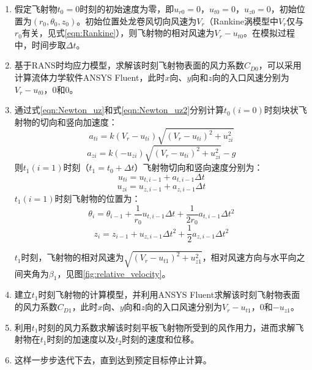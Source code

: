 \documentclass{ctexart}
\begin{document}
\begin{enumerate}
\item 假定飞射物$t_0=0$时刻的初始速度为零，即$u_{r0}=0$，$u_{t0}=0$，$u_{z0}=0$，初始位置为$(r_0,\theta_0,z_0)$。初始位置处龙卷风切向风速为$V_r$（Rankine涡模型中$V_r$仅与$r_0$有关，见式\eqref{eqn:Rankine}），则飞射物的相对风速为$V_r-u_{t0}$。在模拟过程中，时间步取$\Delta t$。
\item 基于RANS时均应力模型，求解该时刻飞射物表面的风力系数$C_{D0}$，可以采用计算流体力学软件ANSYS Fluent\textregistered ，此时$x$向、$y$向和$z$向的入口风速分别为$V_r-u_{t0}$，$0$和$0$。
\item 通过式\eqref{eqn:Newton_uz}和式\eqref{eqn:Newton_uz2}分别计算$t_0(i=0)$时刻块状飞射物的切向和竖向加速度：
\begin{equation}
a_{ti} = k \left(V_r-u_{ti}\right) \sqrt{\left(V_r-u_{ti}\right)^2 + u_{zi}^2}
\end{equation}
\begin{equation}
a_{zi} = k (-u_{zi}) \sqrt{\left(V_r-u_{ti}\right)^2 + u_{zi}^2} -g
\end{equation}
则$t_1(i=1)$时刻（$t_1=t_0+\Delta t$）飞射物切向和竖向速度分别为：
\begin{equation}
u_{ti}=u_{t,i-1}+a_{t,i-1} \Delta t
\end{equation}
\begin{equation}
u_{zi} = u_{z,i-1} + a_{z,i-1} \Delta t
\end{equation}
$t_1(i=1)$时刻飞射物的位置为：
\begin{equation}
\theta_i = \theta_{i-1} + \frac{1}{r_0} u_{t,i-1} \Delta t + \frac{1}{2 r_0} a_{t,i-1} \Delta t ^2
\end{equation}
\begin{equation}
z_i = z_{i-1} + u_{z,i-1} \Delta t ^2 + \frac{1}{2} a_{z,i-1} \Delta t ^2
\end{equation}

$t_1$时刻，飞射物的相对风速为$\sqrt{\left(V_r-u_{t1}\right)^2 + u_{z1}^2}$，相对风速方向与水平向之间夹角为$\beta_1 $，见图\ref{fig:relative_velocity}。

\item 
建立$t_1$时刻飞射物的计算模型，并利用ANSYS Fluent\textregistered 求解该时刻飞射物表面的风力系数$C_{D1}$，此时$x$向、$y$向和$z$向的入口风速分别为$V_r-u_{t1}$，$0$和$-u_{z1}$。

\item
利用$t_1$时刻的风力系数求解该时刻平板飞射物所受到的风作用力，进而求解飞射物在$t_1$时刻的加速度以及$t_2$时刻的速度和位移。

\item
这样一步步迭代下去，直到达到预定目标停止计算。
\end{enumerate}
\end{document}
